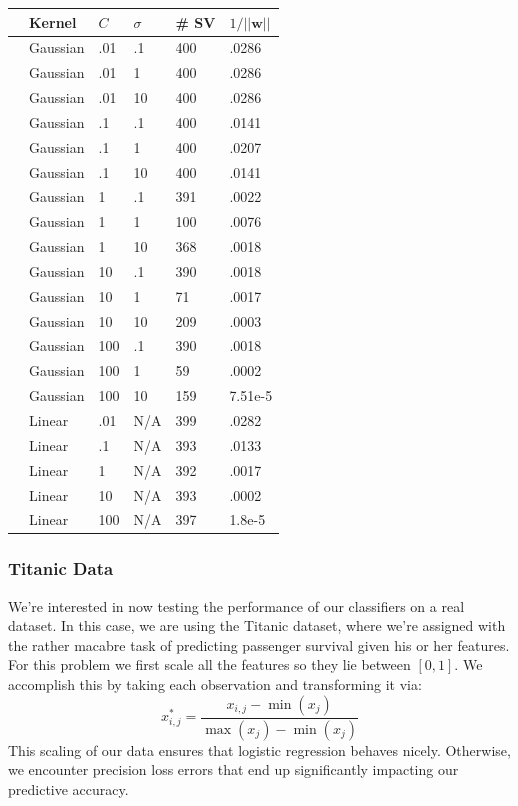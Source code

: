 \documentclass[10pt]{article}
\begin{document}
\begin{table}
\centering
\begin{tabular}{llllll}
\toprule
{} &                        Kernel &      $C$ &   $\sigma$ &    \# SV & $1/||\mathbf{w}||$ \\
\midrule
&    Gaussian &    .01 &    .1 &   400 &    .0286 \\
&    Gaussian &    .01 &    1 &   400 &    .0286 \\
&    Gaussian &    .01 &    10 &   400 &    .0286 \\
&    Gaussian &    .1 &    .1 &   400 &    .0141 \\
&    Gaussian &    .1 &    1 &   400 &    .0207 \\
&    Gaussian &    .1 &    10 &   400 &    .0141 \\
&    Gaussian &    1 &    .1 &   391 &    .0022 \\
&    Gaussian &    1 &    1 &   100 &    .0076 \\
&    Gaussian &    1 &    10 &   368 &    .0018 \\
&    Gaussian &    10 &    .1 &   390 &    .0018 \\
&    Gaussian &    10 &    1 &   71 &    .0017 \\
&    Gaussian &    10 &    10 &   209 &    .0003 \\
&    Gaussian &    100 &    .1 &   390 &    .0018 \\
&    Gaussian &    100 &    1 &   59 &    .0002 \\
&    Gaussian &    100 &    10 &   159 &    7.51e-5 \\
&    Linear &    .01 &    N/A &   399 &    .0282 \\
&    Linear &    .1 &    N/A &   393 &    .0133 \\
&    Linear &    1 &    N/A &   392 &    .0017 \\
&    Linear &    10 &    N/A &   393 &    .0002 \\
&    Linear &    100 &    N/A &   397 &    1.8e-5 \\
\midrule
\bottomrule
\end{tabular}
\end{table}


\subsubsection*{Titanic Data}
We're interested in now testing the performance of our classifiers on a real dataset. In this case, we are using the Titanic dataset, where we're assigned with the rather macabre task of predicting passenger survival given his or her features. For this problem we first scale all the features so they lie between $[0,1]$. We accomplish this by taking each observation and transforming it via:
\begin{equation*}
	x_{i,j}^* = \frac{x_{i,j}-\min(x_j)}{\max(x_j) - \min(x_j)}
\end{equation*}
This scaling of our data ensures that logistic regression behaves nicely. Otherwise, we encounter precision loss errors that end up significantly impacting our predictive accuracy. 
\end{document}
